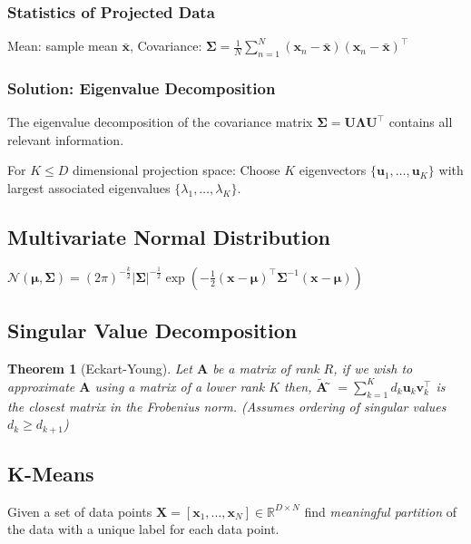 \documentclass[11pt,a4paper,technote]{IEEEtran}
\newtheorem*{thm}{Theorem}
\newcommand{\abs}[1]{\left\lvert#1\right\rvert}
\newcommand{\matr}[1]{\boldsymbol{\mathbf{#1}}}
\newcommand{\vect}[1]{\boldsymbol{\mathbf{#1}}}
\newcommand{\trns}[1]{#1^{\top}}
\newcommand{\normal}{\mathcal{N}}
\newcommand{\R}{\mathbb{R}}
\begin{document}
\subsubsection*{Statistics of Projected Data}
  Mean: sample mean $\bar{\vect{x}}$,
  Covariance:
    \(
      \matr{\Sigma} = \frac{1}{N} \sum_{n=1}^N (\vect{x}_n -
      \bar{\vect{x}}) \trns{(\vect{x}_n - \bar{\vect{x}})}
    \)
\subsubsection*{Solution: Eigenvalue Decomposition}
The eigenvalue decomposition of the covariance matrix
$\matr{\Sigma} = \matr{U}\matr{\Lambda}\trns{\matr{U}}$ contains
all relevant information.

For $K \leq D$ dimensional projection space: Choose $K$ eigenvectors
$\{\vect{u}_1, \dotsc, \vect{u}_K\}$ with largest associated eigenvalues
$\{\lambda_1, \dotsc, \lambda_K\}$.

\vspace{-1em}
\subsection*{Multivariate Normal Distribution}
\hspace{-1em}
 $\normal(\vect{\mu},\matr{\Sigma}) = {(2\pi)}^{-\frac{k}{2}}
 \abs{\matr{\Sigma}}^{-\frac{1}{2}} \exp(-\frac{1}{2} \trns{(\vect{x}-\vect{\mu})}
 \matr{\Sigma}^{-1}(\vect{x}-\vect{\mu}))$


\vspace{-1em}
\subsection*{Singular Value Decomposition}
\begin{thm}[Eckart-Young]
  Let $\matr{A}$ be a matrix of rank $R$, if we wish to
  approximate $\matr{A}$ using a matrix of a lower rank $K$
  then, $\tilde{\matr{A}} ̃= \sum_{k=1}^K d_k \vect{u}_k
  \trns{\vect{v}_k}$ is the closest matrix in the Frobenius norm.
  (Assumes ordering of singular values $d_k \geq d_{k+1}$)
\end{thm}

\vspace{-1em}
\subsection*{K-Means}
Given a set of data points $\matr{X} = [\vect{x}_1, \dotsc, \vect{x}_N] \in
\R^{D\times N}$ find \emph{meaningful partition} of the data with a unique label
for each data point.
\end{document}
